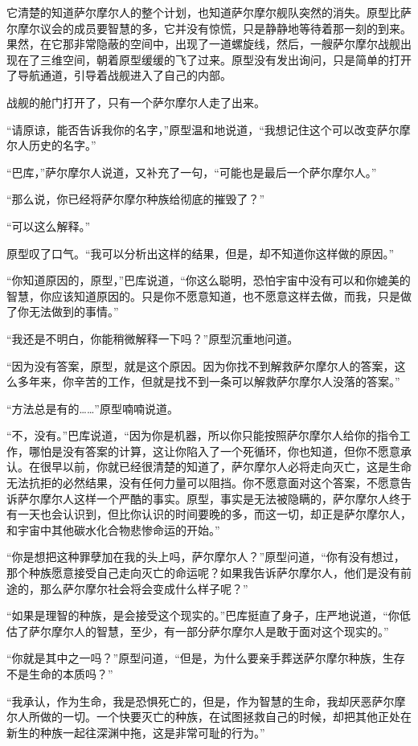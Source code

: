 它清楚的知道萨尔摩尔人的整个计划，也知道萨尔摩尔舰队突然的消失。原型比萨尔摩尔议会的成员要智慧的多，它并没有惊慌，只是静静地等待着那一刻的到来。果然，在它那非常隐蔽的空间中，出现了一道螺旋线，然后，一艘萨尔摩尔战舰出现在了三维空间，朝着原型缓缓的飞了过来。原型没有发出询问，只是简单的打开了导航通道，引导着战舰进入了自己的内部。 

战舰的舱门打开了，只有一个萨尔摩尔人走了出来。 

“请原谅，能否告诉我你的名字，”原型温和地说道，“我想记住这个可以改变萨尔摩尔人历史的名字。” 

“巴库，”萨尔摩尔人说道，又补充了一句，“可能也是最后一个萨尔摩尔人。” 

“那么说，你已经将萨尔摩尔种族给彻底的摧毁了？” 

“可以这么解释。” 

原型叹了口气。“我可以分析出这样的结果，但是，却不知道你这样做的原因。” 

“你知道原因的，原型，”巴库说道，“你这么聪明，恐怕宇宙中没有可以和你媲美的智慧，你应该知道原因的。只是你不愿意知道，也不愿意这样去做，而我，只是做了你无法做到的事情。” 

“我还是不明白，你能稍微解释一下吗？”原型沉重地问道。 

“因为没有答案，原型，就是这个原因。因为你找不到解救萨尔摩尔人的答案，这么多年来，你辛苦的工作，但就是找不到一条可以解救萨尔摩尔人没落的答案。” 

“方法总是有的……”原型喃喃说道。 

“不，没有。”巴库说道，“因为你是机器，所以你只能按照萨尔摩尔人给你的指令工作，哪怕是没有答案的计算，这让你陷入了一个死循环，你也知道，但你不愿意承认。在很早以前，你就已经很清楚的知道了，萨尔摩尔人必将走向灭亡，这是生命无法抗拒的必然结果，没有任何力量可以阻挡。你不愿意面对这个答案，不愿意告诉萨尔摩尔人这样一个严酷的事实。原型，事实是无法被隐瞒的，萨尔摩尔人终于有一天也会认识到，但比你认识的时间要晚的多，而这一切，却正是萨尔摩尔人，和宇宙中其他碳水化合物悲惨命运的开始。” 

“你是想把这种罪孽加在我的头上吗，萨尔摩尔人？”原型问道，“你有没有想过，那个种族愿意接受自己走向灭亡的命运呢？如果我告诉萨尔摩尔人，他们是没有前途的，那么萨尔摩尔社会将会变成什么样子呢？” 

“如果是理智的种族，是会接受这个现实的。”巴库挺直了身子，庄严地说道，“你低估了萨尔摩尔人的智慧，至少，有一部分萨尔摩尔人是敢于面对这个现实的。” 

“你就是其中之一吗？”原型问道，“但是，为什么要亲手葬送萨尔摩尔种族，生存不是生命的本质吗？” 

“我承认，作为生命，我是恐惧死亡的，但是，作为智慧的生命，我却厌恶萨尔摩尔人所做的一切。一个快要灭亡的种族，在试图拯救自己的时候，却把其他正处在新生的种族一起往深渊中拖，这是非常可耻的行为。” 

